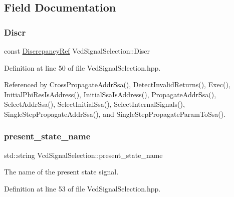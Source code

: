 \subsection{Field Documentation}
\mbox{\label{classVcdSignalSelection_a0c74cd3db4812664f09c33f4d931aadb}} 
\subsubsection{\texorpdfstring{Discr}{Discr}}
{\footnotesize\ttfamily const \hyperlink{Discrepancy_8hpp_a9fb5a8938b4eeaafdaf7707f583f0193}{Discrepancy\+Ref} Vcd\+Signal\+Selection\+::\+Discr\hspace{0.3cm}{\ttfamily [protected]}}



Definition at line 50 of file Vcd\+Signal\+Selection.\+hpp.



Referenced by Cross\+Propagate\+Addr\+Ssa(), Detect\+Invalid\+Returns(), Exec(), Initial\+Phi\+Res\+Is\+Address(), Initial\+Ssa\+Is\+Address(), Propagate\+Addr\+Ssa(), Select\+Addr\+Ssa(), Select\+Initial\+Ssa(), Select\+Internal\+Signals(), Single\+Step\+Propagate\+Addr\+Ssa(), and Single\+Step\+Propagate\+Param\+To\+Ssa().

\mbox{\label{classVcdSignalSelection_a386b41b66fbcf0ec332362c60f57b734}} 
\subsubsection{\texorpdfstring{present\+\_\+state\+\_\+name}{present\_state\_name}}
{\footnotesize\ttfamily std\+::string Vcd\+Signal\+Selection\+::present\+\_\+state\+\_\+name\hspace{0.3cm}{\ttfamily [protected]}}



The name of the present state signal. 



Definition at line 53 of file Vcd\+Signal\+Selection.\+hpp.



